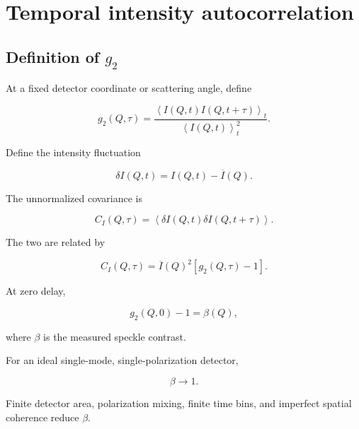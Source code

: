 \documentclass[11pt]{article}
\newcommand{\avg}[1]{\left\langle #1 \right\rangle}
\begin{document}
\section{Temporal intensity autocorrelation}

\subsection{Definition of \texorpdfstring{$g_2$}{g2}}

At a fixed detector coordinate or scattering angle, define

\begin{equation}
    g_2(Q,\tau)
    =
    \frac{
        \avg{I(Q,t)I(Q,t+\tau)}_t
    }{
        \avg{I(Q,t)}_t^2
    }.
    \label{eq:g2definition}
\end{equation}

Define the intensity fluctuation

\begin{equation}
    \delta I(Q,t)
    =
    I(Q,t)-\overline{I}(Q).
\end{equation}

The unnormalized covariance is

\begin{equation}
    C_I(Q,\tau)
    =
    \avg{
        \delta I(Q,t)
        \delta I(Q,t+\tau)
    }.
\end{equation}

The two are related by

\begin{equation}
    C_I(Q,\tau)
    =
    \overline{I}(Q)^2
    \left[
        g_2(Q,\tau)-1
    \right].
    \label{eq:cov_from_g2}
\end{equation}

At zero delay,

\begin{equation}
    g_2(Q,0)-1=\beta(Q),
\end{equation}

where $\beta$ is the measured speckle contrast.

For an ideal single-mode, single-polarization detector,

\begin{equation}
    \beta \rightarrow 1.
\end{equation}

Finite detector area, polarization mixing, finite time bins, and imperfect
spatial coherence reduce $\beta$.
\end{document}
